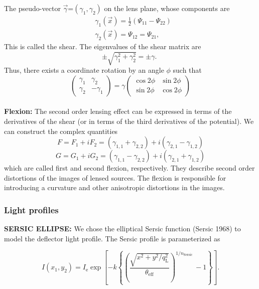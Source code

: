 \documentclass{aa}
\begin{document}
The pseudo-vector $\vec{\gamma}$=$(\gamma_1, \gamma_2)$ on the lens plane, whose components are
%
\begin{equation}
    \begin{aligned}
        & \gamma_1(\vec{x})=\frac{1}{2}\left(\Psi_{11}-\Psi_{22}\right) \\
        & \gamma_2(\vec{x})=\Psi_{12}=\Psi_{21},
    \end{aligned}
\end{equation}
%
This is called the shear. The eigenvalues of the shear matrix are
$$
\pm \sqrt{\gamma_1^2+\gamma_2^2}= \pm \gamma \text {. }
$$
Thus, there exists a coordinate rotation by an angle $\phi$ such that
$$
\left(\begin{array}{cc}
\gamma_1 & \gamma_2 \\
\gamma_2 & -\gamma_1
\end{array}\right)=\gamma\left(\begin{array}{cc}
\cos 2 \phi & \sin 2 \phi \\
\sin 2 \phi & \cos 2 \phi
\end{array}\right)
$$
\\
\newline 
\textbf{Flexion:} The second order lensing effect can be expressed in terms of the derivatives of the shear (or in terms of the third derivatives of the potential). We can construct the complex quantities
$$
F= F_1 + iF_2 = \left(\gamma_{\mathrm{1,1}} + \gamma_{\mathrm{2,2}}\right) + i\left(\gamma_{\mathrm{2,1}} - \gamma_{\mathrm{1,2}}\right)
$$
$$
G= G_1 + iG_2 = \left(\gamma_{\mathrm{1,1}} - \gamma_{\mathrm{2,2}}\right) + i\left(\gamma_{\mathrm{2,1}} + \gamma_{\mathrm{1,2}}\right)
$$
which are called first and second flexion, respectively. They describe second order distortions of the images of lensed sources. The flexion is responsible for introducing a curvature and other anisotropic distortions
in the images.


\subsubsection{Light profiles}
\textbf{SERSIC ELLIPSE:}
We chose the elliptical Sersic function (Sersic 1968) to model the deflector light profile. The Sersic profile is parameterized as

$$
I\left(x_1, y_2\right)=I_{\mathrm{e}} \exp \left[-k\left\{\left(\frac{\sqrt{x^2+y^2 / q_{\mathrm{L}}^2}}{\theta_{\mathrm{eff}}}\right)^{1 / n_{\text {Sersic }}}-1\right\}\right] .
$$
\end{document}
